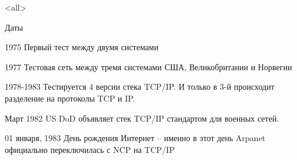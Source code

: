 

\subtitle[TCP/IP]{Стек протоколов TCP/IP}



\mode<all>{}

%
%

\begin{frame}{Даты}
	\begin{block}{1975}
	Первый тест между двумя системами
	\end{block}
	\pause
	\begin{block}{1977}
	Тестовая сеть между тремя системами США, Великобритании и Норвегии
	\end{block}
	\pause
	\begin{block}{1978-1983}
	Тестируется 4 версии стека TCP/IP. И только в 3-й происходит разделение на протоколы TCP и IP.
	\end{block}
	\pause
	\begin{block}{Март 1982}
	US DoD объявляет стек TCP/IP стандартом для военных сетей.
	\end{block}
	\pause
	\begin{block}{01 января,  1983}
	День рождения Интернет -- именно в этот день Arpanet официально переключилась с NCP на TCP/IP 
	\end{block}
\end{frame}


